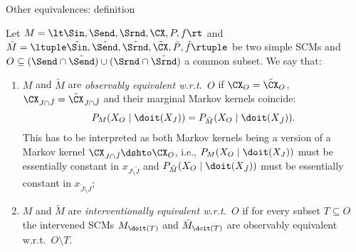\begin{frame}{Other equivalences: definition}
  \begin{Def}[\ref{def:scm_obs_interv_equiv}]
  Let $M = \lt \Sin, \Send, \Srnd, \CX, P, f \rt$ and
  $\tilde{M} = \ltuple \tilde{\Sin}, \tilde{\Send}, \tilde{\Srnd}, \tilde{\CX}, \tilde{P}, \tilde{f} \rtuple$ be two simple SCMs
  and $O \subseteq (\Send \cap \tilde{\Send}) \cup (\Srnd \cap \tilde{\Srnd})$ a common subset.
  We say that:
  \begin{enumerate}
    \item $M$ and $\tilde{M}$ are \emph{observably equivalent w.r.t.\ $O$} if $\CX_O = \tilde{\CX}_O$, $\CX_{J \cap \tilde{J}} = \tilde{\CX}_{J \cap \tilde{J}}$ and their marginal Markov kernels coincide:
      $$P_{M}(X_O \mid \doit(X_J)) = P_{\tilde{M}}(X_O \mid \doit(X_{\tilde J})).$$
    This has to be interpreted as both Markov kernels being a version of a Markov kernel $\CX_{J \cap \tilde{J}} \dshto \CX_O$,
    i.e., $P_{M}(X_O \mid \doit(X_J))$ must be essentially constant in $x_{J \setminus \tilde{J}}$ and
    $P_{\tilde{M}}(X_O \mid \doit(X_{\tilde{J}}))$ must be essentially constant in $x_{\tilde{J} \setminus J}$;
    \item $M$ and $\tilde{M}$ are \emph{interventionally equivalent w.r.t.\ $O$} if for every subset $T \subseteq O$ the intervened SCMs $M_{\doit(T)}$ and $\tilde{M}_{\doit(T)}$ are observably equivalent w.r.t.\ $O \setminus T$.
  \end{enumerate}
\end{Def}
\end{frame}

